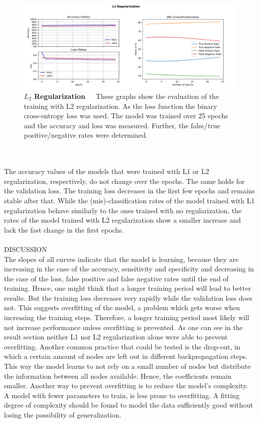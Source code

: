 \begin{figure}[h]
	\centering
	\includegraphics[scale=0.37]{Figures/chapter04/multilabel_L2.png}
	\decoRule
	\caption[\(L_2\) Regularization]{\textbf{\(L_2\) Regularization}~~~These graphs show the evaluation of the training with L2 regularization. As the loss function the binary cross-entropy loss was used. The model was trained over 25 epochs and the accuracy and loss was measured. Further, the false/true positive/negative rates were determined.}
	\label{fig:MultilabelL2Regularization}
\end{figure}
\\
\\
The accuracy values of the models that were trained with L1 or L2 regularization, respectively, do not change over the epochs. The same holds for the validation loss. The training loss decreases in the first few epochs and remains stable after that.
While the (mis)-classification rates of the model trained with L1 regularization behave similarly to the ones trained with no regularization, the rates of the model trained with L2 regularization show a smaller increase and lack the fast change in the first epochs. \\
\\
DISCUSSION \\
The slopes of all curves indicate that the model is learning, because they are increasing in the case of the accuracy, sensitivity and specificity and decreasing in the case of the loss, false positive and false negative rates until the end of training. Hence, one might think that a longer training period will lead to better results. But the training loss decreases very rapidly while the validation loss does not. This suggests overfitting of the model, a problem which gets worse when increasing the training steps. Therefore, a longer training period most likely will not increase performance unless overfitting is prevented. As one can see in the result section neither L1 nor L2 regularization alone were able to prevent overfitting. Another common practice that could be tested is the drop-out, in which a certain amount of nodes are left out in different backpropagation steps. This way the model learns to not rely on a small number of nodes but distribute the information between all nodes available. Hence, the coefficients remain smaller. Another way to prevent overfitting is to reduce the model's complexity. A model with fewer parameters to train, is less prone to overfitting. A fitting degree of complexity should be found to model the data sufficiently good without losing the possibility of generalization. \\
